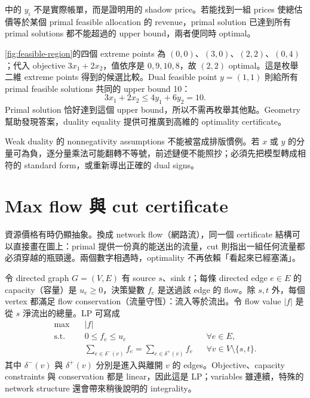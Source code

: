 \documentclass[11pt,a4paper,oneside,openany]{book}
\begin{document}
 中的 $y_i$ 不是實際帳單，而是證明用的 shadow price。若能找到一組 prices 使總估價等於某個 primal feasible allocation 的 revenue，primal solution 已達到所有 primal solutions 都不能超過的 upper bound，兩者便同時 optimal。

\begin{example}
\cref{fig:feasible-region}的四個 extreme points 為 $(0,0)$、$(3,0)$、$(2,2)$、$(0,4)$；代入 objective $3x_1+2x_2$，值依序是 $0,9,10,8$，故 $(2,2)$ optimal。這是枚舉二維 extreme points 得到的候選比較。Dual feasible point $y=(1,1)$ 則給所有 primal feasible solutions 共同的 upper bound 10：
\[
 3x_1+2x_2\le 4y_1+6y_2=10.
\]
Primal solution 恰好達到這個 upper bound，所以不需再枚舉其他點。Geometry 幫助發現答案，duality equality 提供可推廣到高維的 optimality certificate。
\end{example}

Weak duality 的 nonnegativity assumptions 不能被當成排版慣例。若 $x$ 或 $y$ 的分量可為負，逐分量乘法可能翻轉不等號，前述鏈便不能照抄；必須先把模型轉成相符的 standard form，或重新導出正確的 dual signs。

\section{Max flow 與 cut certificate}
資源價格有時仍顯抽象。換成 network flow（網路流），同一個 certificate 結構可以直接畫在圖上：primal 提供一份真的能送出的流量，cut 則指出一組任何流量都必須穿越的瓶頸邊。兩個數字相遇時，optimality 不再依賴「看起來已經塞滿」。

令 directed graph $G=(V,E)$ 有 source $s$、sink $t$；每條 directed edge $e\in E$ 的 capacity（容量）是 $u_e\ge0$，決策變數 $f_e$ 是送過該 edge 的 flow。除 $s,t$ 外，每個 vertex 都滿足 flow conservation（流量守恆）：流入等於流出。令 flow value $|f|$ 是從 $s$ 淨流出的總量。LP 可寫成
\begin{align*}
\max\quad &|f|\\
\text{s.t.}\quad
&0\le f_e\le u_e &&\forall e\in E,\\
&\sum_{e\in\delta^-(v)}f_e
 =\sum_{e\in\delta^+(v)}f_e
 &&\forall v\in V\setminus\{s,t\}.
\end{align*}
其中 $\delta^-(v)$ 與 $\delta^+(v)$ 分別是進入與離開 $v$ 的 edges。Objective、capacity constraints 與 conservation 都是 linear，因此這是 LP；variables 雖連續，特殊的 network structure 還會帶來稍後說明的 integrality。
\end{document}
